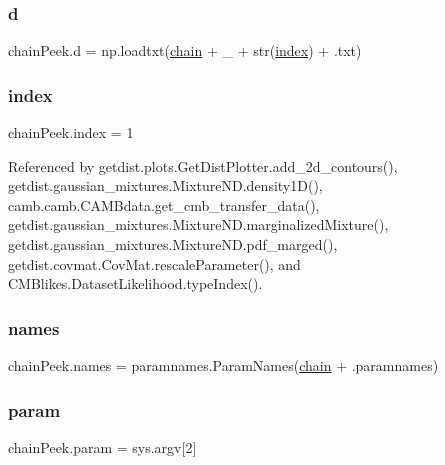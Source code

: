 \subsubsection{\texorpdfstring{d}{d}}
{\footnotesize\ttfamily chain\+Peek.\+d = np.\+loadtxt(\mbox{\hyperlink{namespacechainPeek_a8430d0d56acea0fedb545d9da622d387}{chain}} + \textquotesingle{}\+\_\+\textquotesingle{} + str(\mbox{\hyperlink{namespacechainPeek_a3720d3f634009a2cf9db4482221c6aa0}{index}}) + \textquotesingle{}.txt\textquotesingle{})}

\mbox{\label{namespacechainPeek_a3720d3f634009a2cf9db4482221c6aa0}} 
\subsubsection{\texorpdfstring{index}{index}}
{\footnotesize\ttfamily chain\+Peek.\+index = 1}



Referenced by getdist.\+plots.\+Get\+Dist\+Plotter.\+add\+\_\+2d\+\_\+contours(), getdist.\+gaussian\+\_\+mixtures.\+Mixture\+N\+D.\+density1\+D(), camb.\+camb.\+C\+A\+M\+Bdata.\+get\+\_\+cmb\+\_\+transfer\+\_\+data(), getdist.\+gaussian\+\_\+mixtures.\+Mixture\+N\+D.\+marginalized\+Mixture(), getdist.\+gaussian\+\_\+mixtures.\+Mixture\+N\+D.\+pdf\+\_\+marged(), getdist.\+covmat.\+Cov\+Mat.\+rescale\+Parameter(), and C\+M\+Blikes.\+Dataset\+Likelihood.\+type\+Index().

\mbox{\label{namespacechainPeek_a39ef5b3ddd1639f887a8ed958fe9c053}} 
\subsubsection{\texorpdfstring{names}{names}}
{\footnotesize\ttfamily chain\+Peek.\+names = paramnames.\+Param\+Names(\mbox{\hyperlink{namespacechainPeek_a8430d0d56acea0fedb545d9da622d387}{chain}} + \textquotesingle{}.paramnames\textquotesingle{})}

\mbox{\label{namespacechainPeek_a8a13d4184b76d34d205243badf66a307}} 
\subsubsection{\texorpdfstring{param}{param}}
{\footnotesize\ttfamily chain\+Peek.\+param = sys.\+argv\mbox{[}2\mbox{]}}

